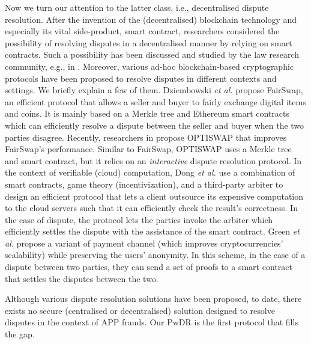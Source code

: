 Now we turn our attention to the latter class, i.e., decentralised dispute resolution. After the invention of the (decentralised) blockchain technology and  especially its vital side-product, smart contract, researchers considered  the possibility of resolving disputes in a decentralised manner by relying on smart contracts. Such a possibility has been discussed and studied by the law research community, e.g., in \cite{buchwald2019smart,ortolani2016self,ortolani2019impact}. Moreover,  various ad-hoc blockchain-based cryptographic protocols have been  proposed to resolve disputes in different contexts and settings. We briefly explain a few of them. Dziembowski \textit{et al.}  \cite{DziembowskiEF18} propose FairSwap, an efficient protocol that allows a seller and buyer to fairly exchange  digital items  and  coins. It is mainly based on a Merkle tree and Ethereum smart contracts which can efficiently resolve a dispute between the seller and buyer  when the two parties disagree. Recently, researchers in  \cite{EckeyFS20} propose OPTISWAP that improves FairSwap’s performance. Similar to FairSwap, OPTISWAP uses a Merkle tree and smart contract, but  it relies on an \emph{interactive} dispute resolution protocol. In the context of verifiable (cloud) computation, Dong \textit{et al.} \cite{DongWAMM17} use a combination of smart contracts, game theory (incentivization), and a   third-party arbiter to design an efficient protocol  that lets a client outsource its expensive computation to the cloud servers such that it can efficiently check the result's correctness. In the case of dispute, the protocol lets the parties  invoke the  arbiter which efficiently settles the dispute with the assistance of the smart contract. Green \textit{et al.} \cite{Bolt} propose a variant  of  payment channel \cite{Lightning-Network} (which improves cryptocurrencies' scalability) while preserving the users' anonymity. In this scheme, in the case of a dispute between two parties, they can send a set of proofs to a smart contract that settles the disputes between the two. 



 

Although various dispute resolution solutions have been proposed, to date, there exists no secure (centralised or decentralised) solution  designed to resolve disputes in the context of APP frauds.  Our PwDR is the first protocol that fills the gap. 

 



 

